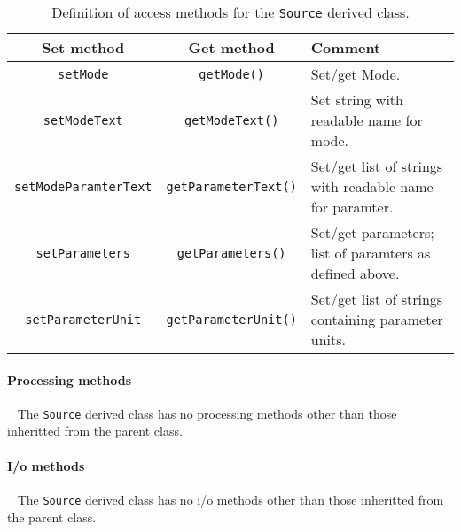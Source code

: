 \begin{table}[h]
  \caption{
    Definition of access methods for the \texttt{Source} derived
    class. 
  }
  \label{Tab:Source:Methods}
  \begin{center}
    \begin{tabular}{|c|c|p{5cm}|}
      \hline
      \textbf{Set method} & \textbf{Get method}  & \textbf{Comment}                                                 \\
      \hline
      \texttt{setMode}             & \texttt{getMode()}          & Set/get Mode.                \\
      \texttt{setModeText}         & \texttt{getModeText()}      & Set string with readable name for mode.  \\
      \texttt{setModeParamterText} & \texttt{getParameterText()} & Set/get list of strings with readable name for paramter. \\
      \texttt{setParameters}       & \texttt{getParameters()}    & Set/get parameters; list of paramters as defined above. \\ 
      \texttt{setParameterUnit}    & \texttt{getParameterUnit()} & Set/get list of strings containing parameter units.  \\
      \hline
    \end{tabular}
  \end{center}
\end{table}

\paragraph{Processing methods} ~\newline
\noindent
The \texttt{Source} derived class has no processing
methods other than those inheritted from the parent class.

\paragraph{I/o methods} ~\newline
\noindent
The \texttt{Source} derived class has no i/o methods other
than those inheritted from the parent class.

